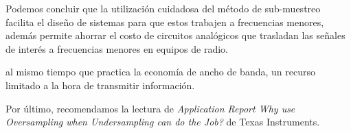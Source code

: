 Podemos concluir que la utilización cuidadosa del método de sub-muestreo facilita el diseño de sistemas para que estos trabajen a frecuencias menores, además permite ahorrar el costo de circuitos analógicos que trasladan las señales de interés a frecuencias menores en equipos de radio.

 al mismo tiempo que practica la economía de ancho de banda, un recurso limitado a la hora de transmitir información.

Por último, recomendamos la lectura de \textit{Application Report Why use Oversampling when Undersampling can do the Job?
} de Texas Instruments.

%